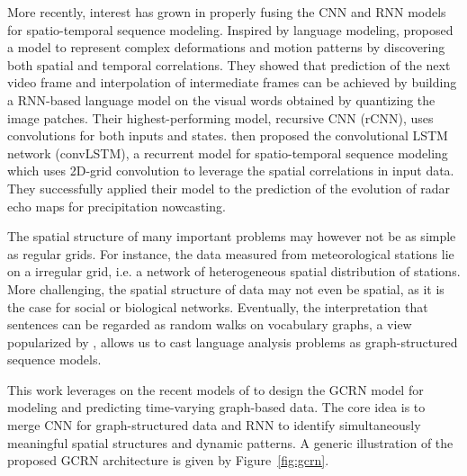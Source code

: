 \documentclass{article} %
\newcommand{\figref}[1]{Figure~\ref{fig:#1}}
\newcommand{\todo}[1]{{\color{red} #1 }}
\begin{document}
More recently, interest has grown in properly fusing the CNN and RNN models for
spatio-temporal sequence modeling. Inspired by language modeling,
\citet{video_language_model} proposed a model to represent complex deformations
and motion patterns by discovering both spatial and temporal correlations. They showed that prediction of the next video frame and
interpolation of intermediate frames can be achieved by building a RNN-based
language model on the visual words obtained by quantizing the image patches.
Their highest-performing model, recursive CNN (rCNN), uses convolutions for both
 inputs and states. \citet{convlstm}  then proposed the convolutional
LSTM network (convLSTM), a recurrent model for spatio-temporal sequence
modeling which uses 2D-grid convolution to leverage the spatial correlations in
input data. They successfully applied their model to the prediction of the
evolution of radar echo maps for precipitation nowcasting.



The spatial structure of many important problems may however not be as simple as regular grids. For instance, 
the data measured from meteorological stations lie on a irregular grid, i.e. a network of heterogeneous spatial
distribution of stations. More challenging, the spatial structure of data may not even be spatial, as it is the case for social or biological networks. Eventually, the interpretation that sentences can be regarded as random walks on vocabulary graphs,
a view popularized by \cite{word2vec}, allows us to cast language analysis problems as graph-structured sequence models.

This work leverages on the recent models of
\cite{gcnn,video_language_model,convlstm} to design the GCRN model for modeling
and predicting time-varying graph-based data. The core idea is to merge CNN for
graph-structured data and RNN to identify simultaneously meaningful spatial
structures and dynamic patterns. A generic illustration of the proposed GCRN
architecture is given by \figref{gcrn}.
\end{document}
